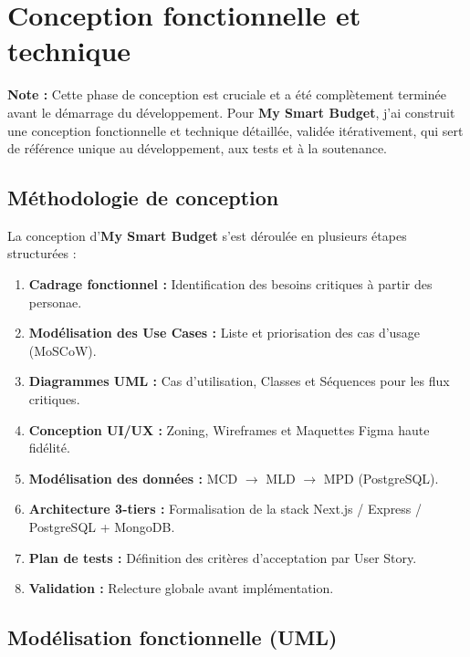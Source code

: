 \chapter{Conception fonctionnelle et technique}

\textbf{Note :} Cette phase de conception est cruciale et a été complètement terminée avant le démarrage du développement. Pour \textbf{My Smart Budget}, j'ai construit une conception fonctionnelle et technique détaillée, validée itérativement, qui sert de référence unique au développement, aux tests et à la soutenance.

\section{Méthodologie de conception}

La conception d'\textbf{My Smart Budget} s'est déroulée en plusieurs étapes structurées :

\begin{enumerate}
    \item \textbf{Cadrage fonctionnel :} Identification des besoins critiques à partir des personae.
    \item \textbf{Modélisation des Use Cases :} Liste et priorisation des cas d'usage (MoSCoW).
    \item \textbf{Diagrammes UML :} Cas d'utilisation, Classes et Séquences pour les flux critiques.
    \item \textbf{Conception UI/UX :} Zoning, Wireframes et Maquettes Figma haute fidélité.
    \item \textbf{Modélisation des données :} MCD $\rightarrow$ MLD $\rightarrow$ MPD (PostgreSQL).
    \item \textbf{Architecture 3-tiers :} Formalisation de la stack Next.js / Express / PostgreSQL + MongoDB.
    \item \textbf{Plan de tests :} Définition des critères d'acceptation par User Story.
    \item \textbf{Validation :} Relecture globale avant implémentation.
\end{enumerate}



\section{Modélisation fonctionnelle (UML)}

